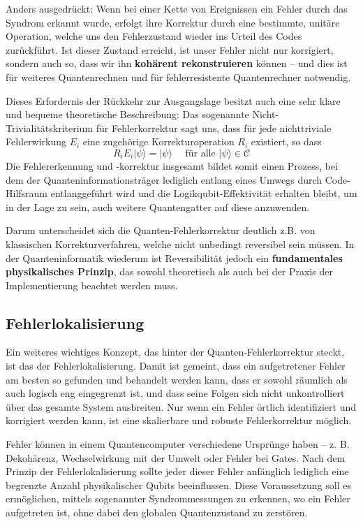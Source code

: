 Anders ausgedrückt: Wenn bei einer Kette von Ereignissen ein Fehler durch das Syndrom erkannt wurde, erfolgt ihre Korrektur durch eine bestimmte, unitäre Operation, welche uns den Fehlerzustand wieder ins Urteil des Codes zurückführt. Ist dieser Zustand erreicht, ist unser Fehler nicht nur korrigiert, sondern auch so, dass wir ihn\textbf{ kohärent rekonstruieren} können – und dies ist für weiteres Quantenrechnen und für fehlerresistente Quantenrechner notwendig.

Dieses Erfordernis der Rückkehr zur Ausgangslage besitzt auch eine sehr klare und bequeme theoretische Beschreibung: Das sogenannte Nicht-Trivialitätskriterium für Fehlerkorrektur sagt uns, dass für jede nichttriviale Fehlerwirkung \(E_i\) eine zugehörige Korrekturoperation \(R_i\) existiert, so dass 
\begin{equation}
    R_{i} E_{i}|\psi\rangle=|\psi\rangle \quad \text { für alle }|\psi\rangle \in \mathcal{C}
\end{equation}
Die Fehlererkennung und -korrektur insgesamt bildet somit einen Prozess, bei dem der Quanteninformationsträger lediglich entlang eines Umwegs durch Code-Hilfsraum entlanggeführt wird und die Logikqubit-Effektivität erhalten bleibt, um in der Lage zu sein, auch weitere Quantengatter auf diese anzuwenden.

Darum unterscheidet sich die Quanten-Fehlerkorrektur deutlich z.B. von klassischen Korrekturverfahren, welche nicht unbedingt reversibel sein müssen. In der Quanteninformatik wiederum ist Reversibilität jedoch ein \textbf{fundamentales physikalisches Prinzip}, das sowohl theoretisch als auch bei der Praxis der Implementierung beachtet werden muss.

\subsection{Fehlerlokalisierung}
Ein weiteres wichtiges Konzept, das hinter der Quanten-Fehlerkorrektur steckt, ist das der Fehlerlokalisierung. Damit ist gemeint, dass ein aufgetretener Fehler am besten so gefunden und behandelt werden kann, dass er sowohl räumlich als auch logisch eng eingegrenzt ist, und dass seine Folgen sich nicht unkontrolliert über das gesamte System ausbreiten. Nur wenn ein Fehler örtlich identifiziert und korrigiert werden kann, ist eine skalierbare und robuste Fehlerkorrektur möglich. \cite[Seite 451-452]{nielsen_michael_a_and_isaac_l_chuang_quantum_2010}

Fehler können in einem Quantencomputer verschiedene Ursprünge haben – z. B. Dekohärenz, Wechselwirkung mit der Umwelt oder Fehler bei Gates. Nach dem Prinzip der Fehlerlokalisierung sollte jeder dieser Fehler anfänglich lediglich eine begrenzte Anzahl physikalischer Qubits beeinflussen. Diese Voraussetzung soll es ermöglichen, mittels sogenannter Syndrommessungen zu erkennen, wo ein Fehler aufgetreten ist, ohne dabei den globalen Quantenzustand zu zerstören.

